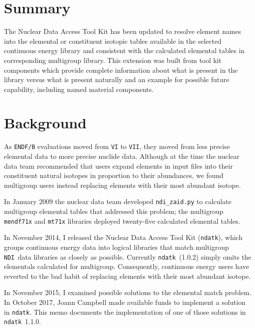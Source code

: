 \documentclass[12pt]{lamemo}
\date{December 13, 2017}
\newcommand{\ndatk}{\texttt{ndatk}}
\newcommand{\NDI}{\texttt{NDI}}
\begin{document}
\lstset{language=C++}

\maketitle			%

\section{Summary}

The Nuclear Data Access Tool Kit has been updated to resolve element
names into the elemental or constituent isotopic tables available in
the selected continuous energy library and consistent with the
calculated elemental tables in corresponding multigroup library.  This
extension was built from tool kit components which provide complete
information about what is present in the library versus what is
present naturally and an example for possible future capability,
including named material components.

\section{Background}

As \texttt{ENDF/B} evaluations moved from \texttt{VI} to \texttt{VII},
they moved from less precise elemental data to more precise nuclide
data.  Although at the time the nuclear data team recommended that
users expand elements in input files into their constituent natural
isotopes in proportion to their abundances, we found multigroup users
instead replacing elements with their most abundant isotope.

In January 2009 the nuclear data team developed \texttt{ndi\_zaid.py}
to calculate multigroup elemental tables\cite{gray09} that addressed
this problem; the multigroup \texttt{mendf71x} and \texttt{mt71x}
libraries deployed twenty-five calculated elemental tables.

In November 2014, I released the Nuclear Data Access Tool Kit
(\ndatk)\cite{gray14}, which groups continuous energy data into
logical libraries that match multigroup \NDI\ data libraries as
closely as possible.  Currently \ndatk\ (1.0.2) simply omits the
elementals calculated for multigroup.  Consequently, continuous energy
users have reverted to the bad habit of replacing elements with their
most abundant isotope.
 
In November 2015, I examined possible solutions to the elemental match
problem\cite{gray15}.  In October 2017, Joann Campbell made available
funds to implement a solution in \ndatk. This memo documents the
implementation of one of those solutions in \ndatk\ 1.1.0.
\end{document}
